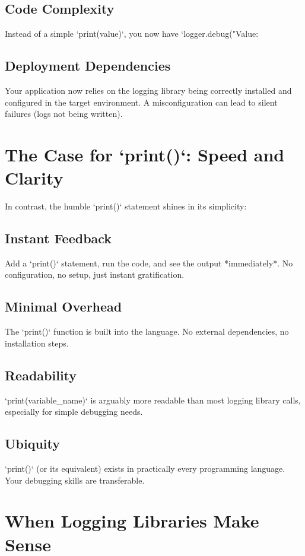 \documentclass{article}
\begin{document}
\subsection*{Code Complexity}
Instead of a simple `print(value)`, you now have `logger.debug("Value: %

\subsection*{Deployment Dependencies}
Your application now relies on the logging library being correctly installed and configured in the target environment. A misconfiguration can lead to silent failures (logs not being written).

\section*{The Case for `print()`: Speed and Clarity}

In contrast, the humble `print()` statement shines in its simplicity:

\subsection*{Instant Feedback}
Add a `print()` statement, run the code, and see the output *immediately*. No configuration, no setup, just instant gratification.

\subsection*{Minimal Overhead}
The `print()` function is built into the language. No external dependencies, no installation steps.

\subsection*{Readability}
`print(variable_name)` is arguably more readable than most logging library calls, especially for simple debugging needs.

\subsection*{Ubiquity}
`print()` (or its equivalent) exists in practically every programming language. Your debugging skills are transferable.

\section*{When Logging Libraries Make Sense}
\end{document}
